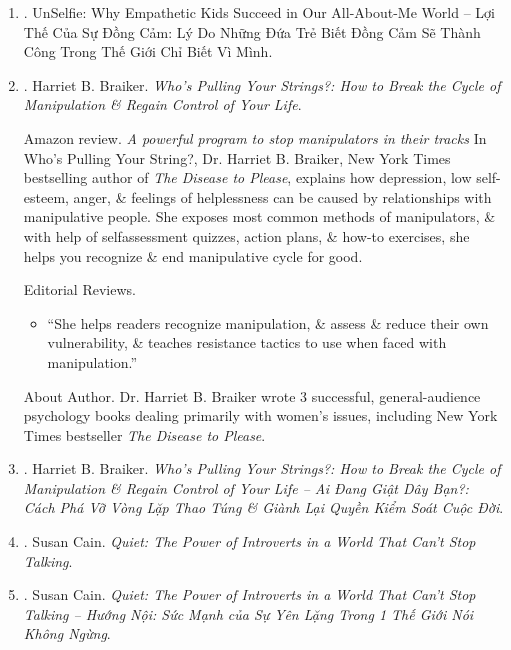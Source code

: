 \documentclass{article}
\begin{document}
\begin{enumerate}
	\item \cite{Borba_sympathy_VN}. {\sc UnSelfie: Why Empathetic Kids Succeed in Our All-About-Me World -- Lợi Thế Của Sự Đồng Cảm: Lý Do Những Đứa Trẻ Biết Đồng Cảm Sẽ Thành Công Trong Thế Giới Chỉ Biết Vì Mình}.\hfill{\sf[done]}
	
	\item \cite{Braiker_string}. {\sc Harriet B. Braiker}. {\it Who's Pulling Your Strings?: How to Break the Cycle of Manipulation \& Regain Control of Your Life}. {}
	
	{\sf Amazon review.} {\it A powerful program to stop manipulators in their tracks} In Who's Pulling Your String?, Dr. {\sc Harriet B. Braiker}, New York Times bestselling author of {\it The Disease to Please}, explains how depression, low self-esteem, anger, \& feelings of helplessness can be caused by relationships with manipulative people. She exposes most common methods of manipulators, \& with help of selfassessment quizzes, action plans, \& how-to exercises, she helps you recognize \& end manipulative cycle for good.
	
	{\sf Editorial Reviews.}
	\begin{itemize}
		\item ``She helps readers recognize manipulation, \& assess \& reduce their own vulnerability, \& teaches resistance tactics to use when faced with manipulation.''
	\end{itemize}
	{\sf About Author.} Dr. {\sc Harriet B. Braiker} wrote 3 successful, general-audience psychology books dealing primarily with women's issues, including New York Times bestseller {\it The Disease to Please}.
	
	\item \cite{Braiker_string_VN}. {\sc Harriet B. Braiker}. {\it Who's Pulling Your Strings?: How to Break the Cycle of Manipulation \& Regain Control of Your Life -- Ai Đang Giật Dây Bạn?: Cách Phá Vỡ Vòng Lặp Thao Túng \& Giành Lại Quyền Kiểm Soát Cuộc Đời}.
	
	\item \cite{Cain_quiet}. Susan Cain. {\it Quiet: The Power of Introverts in a World That Can't Stop Talking}.\hfill{\sf[reading]}
	
	\item \cite{Cain_quiet_VN}. Susan Cain. {\it Quiet: The Power of Introverts in a World That Can't Stop Talking -- Hướng Nội: Sức Mạnh của Sự Yên Lặng Trong 1 Thế Giới Nói Không Ngừng}.\hfill{\sf[done]}
	

\end{enumerate}
\end{document}

